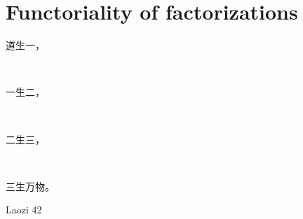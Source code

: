 \section{Functoriality of factorizations }\label{sec:thmA}
\setlength{\epigraphwidth}{.2\textwidth}
\epigraph{
	\begin{CJK}{UTF8}{min}道生一，\end{CJK}\\
	\begin{CJK}{UTF8}{min}一生二，\end{CJK}\\
	\begin{CJK}{UTF8}{min}二生三，\end{CJK}\\
	\begin{CJK}{UTF8}{min}三生万物。\end{CJK}
}{Laozi 42}
%
%
%
%


